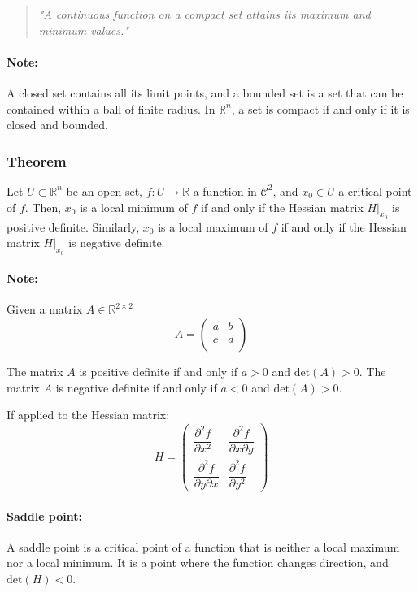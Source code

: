 \documentclass[11pt]{article}
\begin{document}
\begin{quotation}
    \textit{"A continuous function on a compact set attains its maximum and minimum values."}
\end{quotation}

\paragraph{Note:} A closed set contains all its limit points, and a bounded set is a set that can be contained within a ball of finite radius. In $\mathbb{R}^n$, a set is compact if and only if it is closed and bounded.

\subsubsection{Theorem}
Let $U \subset \mathbb{R}^n$ be an open set, $f : U \rightarrow \mathbb{R}$ a function in $\mathcal{C}^2$, and $x_0 \in U$ a critical point of $f$. Then, $x_0$ is a local minimum of $f$ if and only if the Hessian matrix $H\big|_{x_0}$ is positive definite. Similarly, $x_0$ is a local maximum of $f$ if and only if the Hessian matrix $H\big|_{x_0}$ is negative definite.

\paragraph{Note:} Given a matrix $A \in \mathbb{R}^{2 \times 2}$
\[
A = \begin{pmatrix}
    a & b \\
    c & d \\
\end{pmatrix}
\]

The matrix $A$ is positive definite if and only if $a > 0$ and $\text{det}(A) > 0$. The matrix $A$ is negative definite if and only if $a < 0$ and $\text{det}(A) > 0$.

If applied to the Hessian matrix:
\[
H = \begin{pmatrix}
    \dfrac{\partial^2 f}{\partial x^2} & \dfrac{\partial^2 f}{\partial x \partial y} \\
    \dfrac{\partial^2 f}{\partial y \partial x} & \dfrac{\partial^2 f}{\partial y^2}
\end{pmatrix}
\]

\paragraph{Saddle point:} A saddle point is a critical point of a function that is neither a local maximum nor a local minimum. It is a point where the function changes direction, and $\text{det}(H) < 0$.
\end{document}

